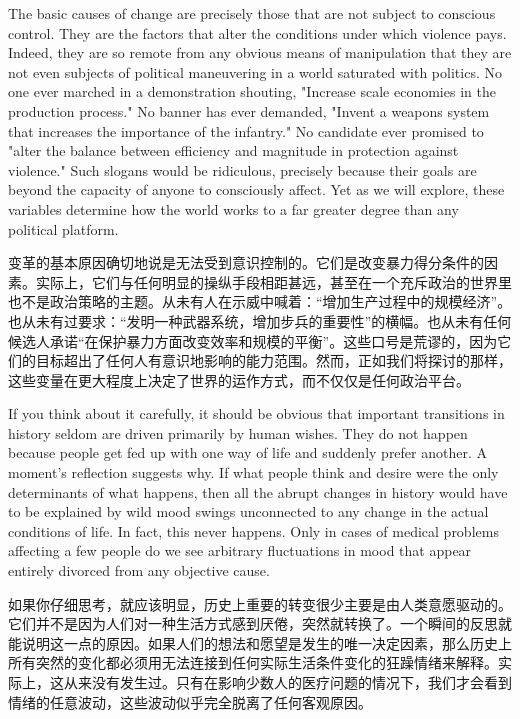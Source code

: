 \begin{Parallel}{97mm}{72mm}
  \ParallelLText
  {The basic causes of change are precisely those that are not subject to conscious control. They are the factors that alter the conditions under which violence pays. Indeed, they are so remote from any obvious means of manipulation that they are not even subjects of political maneuvering in a world saturated with politics. No one ever marched in a demonstration shouting, "Increase scale economies in the production process." No banner has ever demanded, "Invent a weapons system that increases the importance of the infantry." No candidate ever promised to "alter the balance between efficiency and magnitude in protection against violence." Such slogans would be ridiculous, precisely because their goals are beyond the capacity of anyone to consciously affect. Yet as we will explore, these variables determine how the world works to a far greater degree than any political platform.}
  
  \ParallelRText
  {变革的基本原因确切地说是无法受到意识控制的。它们是改变暴力得分条件的因素。实际上，它们与任何明显的操纵手段相距甚远，甚至在一个充斥政治的世界里也不是政治策略的主题。从未有人在示威中喊着：“增加生产过程中的规模经济”。也从未有过要求：“发明一种武器系统，增加步兵的重要性”的横幅。也从未有任何候选人承诺“在保护暴力方面改变效率和规模的平衡”。这些口号是荒谬的，因为它们的目标超出了任何人有意识地影响的能力范围。然而，正如我们将探讨的那样，这些变量在更大程度上决定了世界的运作方式，而不仅仅是任何政治平台。}
  \ParallelPar



  \ParallelLText
  {If you think about it carefully, it should be obvious that important transitions in history seldom are driven primarily by human wishes. They do not happen because people get fed up with one way of life and suddenly prefer another. A moment's reflection suggests why. If what people think and desire were the only determinants of what happens, then all the abrupt changes in history would have to be explained by wild mood swings unconnected to any change in the actual conditions of life. In fact, this never happens. Only in cases of medical problems affecting a few people do we see arbitrary fluctuations in mood that appear entirely divorced from any objective cause.}
  
  \ParallelRText
  {如果你仔细思考，就应该明显，历史上重要的转变很少主要是由人类意愿驱动的。它们并不是因为人们对一种生活方式感到厌倦，突然就转换了。一个瞬间的反思就能说明这一点的原因。如果人们的想法和愿望是发生的唯一决定因素，那么历史上所有突然的变化都必须用无法连接到任何实际生活条件变化的狂躁情绪来解释。实际上，这从来没有发生过。只有在影响少数人的医疗问题的情况下，我们才会看到情绪的任意波动，这些波动似乎完全脱离了任何客观原因。}
  \ParallelPar




\end{Parallel}
